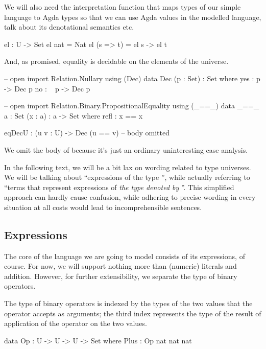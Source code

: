 \noindent We will also need the interpretation function  that maps
types of our simple language to Agda types so that we can use Agda values in
the modelled language, talk about its denotational semantics etc.

\begin{code}
  el : U -> Set
  el nat = Nat
  el (s => t) = el s -> el t
\end{code}

\noindent And, as promised, equality is decidable on the elements of the
universe.

\begin{code}
  -- open import Relation.Nullary using (Dec)
  data Dec (p : Set) : Set where
    yes : p -> Dec p
    no  : ~ p -> Dec p

  -- open import Relation.Binary.PropositionalEquality using (_==\_)
  data _==\_ {a : Set} (x : a) : a -> Set where
    refl : x == x

  eqDecU : (u v : U) -> Dec (u == v)
  -- body omitted
\end{code}

\noindent We omit the body of  because it's just an ordinary
uninteresting case analysis.

In the following text, we will be a bit lax on wording related to type
universes.  We will be talking about ``expressions of the type '',
while actually referring to ``terms that represent expressions of \emph{the
type denoted by }''. This simplified approach can hardly cause
confusion, while adhering to precise wording in every situation at all costs
would lead to incomprehensible sentences.

\subsection{Expressions}

The core of the language we are going to model consists of its expressions, of
course. For now, we will support nothing more than (numeric) literals and addition.
However, for further extensibility, we separate the type of binary operators.

The type of binary operators is indexed by the types of the two values that
the operator accepts as arguments; the third index represents the type of
the result of application of the operator on the two values.

\begin{code}
  data Op : U -> U -> U -> Set where
    Plus : Op nat nat nat
\end{code}

